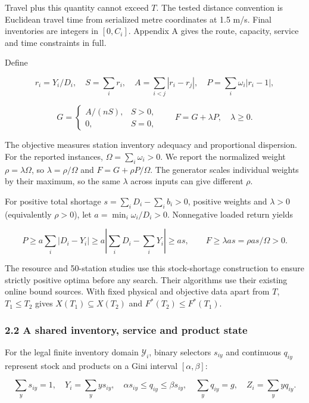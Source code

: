 \documentclass[
  american,
  11pt,
]{article}
\begin{document}
Travel plus this quantity cannot exceed \(T\). The tested distance
convention is Euclidean travel time from serialized metre coordinates at
1.5 m/s. Final inventories are integers in \([0,C_i]\). Appendix A gives
the route, capacity, service and time constraints in full.

Define

\[
r_i=Y_i/D_i,\quad S=\sum_i r_i,\quad
A=\sum_{i<j}|r_i-r_j|,\quad
P=\sum_i\omega_i|r_i-1|,
\]

\[
G=\begin{cases}A/(nS),&S>0,\\0,&S=0,\end{cases}
\qquad F=G+\lambda P,\quad\lambda\ge0.
\]

The objective measures station inventory adequacy and proportional
dispersion. For the reported instances, \(\Omega=\sum_i\omega_i>0\). We
report the normalized weight \(\rho=\lambda\Omega\), so
\(\lambda=\rho/\Omega\) and \(F=G+\rho P/\Omega\). The generator scales
individual weights by their maximum, so the same \(\lambda\) across
inputs can give different \(\rho\).

For positive total shortage \(s=\sum_iD_i-\sum_ib_i>0\), positive
weights and \(\lambda>0\) (equivalently \(\rho>0\)), let
\(a=\min_i\omega_i/D_i>0\). Nonnegative loaded return yields

\[
P\ge a\sum_i|D_i-Y_i|\ge a\left|\sum_iD_i-\sum_iY_i\right|\ge as,
\qquad F\ge\lambda as=\rho as/\Omega>0.
\]

The resource and 50-station studies use this stock-shortage construction
to ensure strictly positive optima before any search. Their algorithms
use their existing online bound sources. With fixed physical and
objective data apart from \(T\), \(T_1\le T_2\) gives
\(X(T_1)\subseteq X(T_2)\) and \(F^*(T_2)\le F^*(T_1)\).

\subsubsection{2.2 A shared inventory, service and product
state}\label{a-shared-inventory-service-and-product-state}

For the legal finite inventory domain \(\mathcal Y_i\), binary selectors
\(s_{iy}\) and continuous \(q_{iy}\) represent stock and products on a
Gini interval \([\alpha,\beta]\):

\[
\sum_y s_{iy}=1,\quad Y_i=\sum_y ys_{iy},\quad
\alpha s_{iy}\le q_{iy}\le\beta s_{iy},\quad
\sum_yq_{iy}=g,\quad Z_i=\sum_y yq_{iy}.
\]
\end{document}
